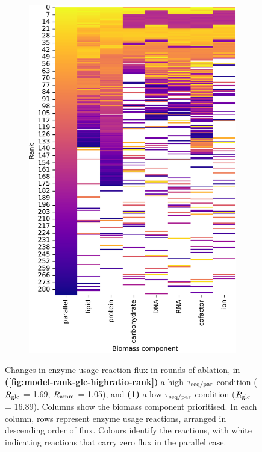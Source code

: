 \begin{figure}
\begin{subfigure}[t]{0.45\textwidth}
    \includegraphics[width=\linewidth]{CompareEnzUse_glc16p89_pyrUnres_ammUnres_1.pdf}
    \caption{
    }
    \label{fig:model-rank-glc-lowratio-rank}
  \end{subfigure}%

  \caption{
    Changes in enzyme usage reaction flux in rounds of ablation, in  \textbf{(\ref{fig:model-rank-glc-highratio-rank})} a high $\tau_{\mathrm{seq}/\mathrm{par}}$ condition ($R_{\mathrm{glc}}$ = \SI{1.69}{\mmolgdwh}, $R_{\mathrm{amm}}$ = \SI{1.05}{\mmolgdwh}), and \textbf{(\ref{fig:model-rank-glc-lowratio-rank})} a low $\tau_{\mathrm{seq}/\mathrm{par}}$ condition ($R_{\mathrm{glc}}$ = \SI{16.89}{\mmolgdwh}).
    Columns show the biomass component prioritised.
    In each column, rows represent enzyme usage reactions, arranged in descending order of flux.
    Colours identify the reactions, with white indicating reactions that carry zero flux in the parallel case.
  }
  \label{fig:model-rank-glc-rank}
\end{figure}

